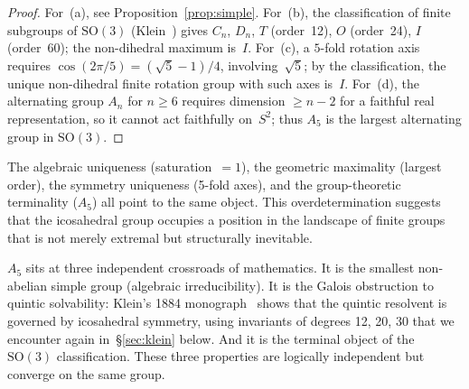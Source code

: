 \documentclass[11pt,letterpaper]{article}
\theoremstyle{definition}
\begin{document}
\begin{proof}
For~(a), see Proposition~\ref{prop:simple}.  For~(b), the classification of finite subgroups of $\mathrm{SO}(3)$ (Klein~\cite{Klein1884}) gives $C_n$, $D_n$, $T$ (order~12), $O$ (order~24), $I$ (order~60); the non-dihedral maximum is~$I$.  For~(c), a $5$-fold rotation axis requires $\cos(2\pi/5)=(\sqrt{5}-1)/4$, involving~$\sqrt{5}$; by the classification, the unique non-dihedral finite rotation group with such axes is~$I$.  For~(d), the alternating group $A_n$ for $n\ge6$ requires dimension $\ge n-2$ for a faithful real representation, so it cannot act faithfully on~$S^2$; thus $A_5$ is the largest alternating group in $\mathrm{SO}(3)$.
\end{proof}
The algebraic uniqueness (saturation~$=1$), the geometric maximality (largest order), the symmetry uniqueness (5-fold axes), and the group-theoretic terminality ($A_5$) all point to the same object.  This overdetermination suggests that the icosahedral group occupies a position in the landscape of finite groups that is not merely extremal but structurally inevitable.
\begin{remarkbox}
$A_5$ sits at three independent crossroads of mathematics.  It is the smallest non-abelian simple group (algebraic irreducibility).  It is the Galois obstruction to quintic solvability: Klein's 1884 monograph~\cite{Klein1884} shows that the quintic resolvent is governed by icosahedral symmetry, using invariants of degrees 12, 20, 30 that we encounter again in~\S\ref{sec:klein} below.  And it is the terminal object of the $\mathrm{SO}(3)$ classification.  These three properties are logically independent but converge on the same group.
\end{remarkbox}
\end{document}
